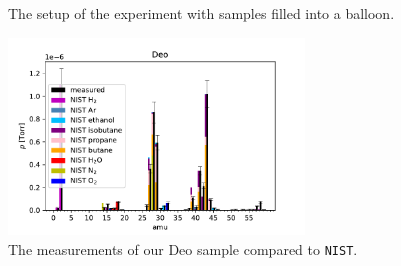     \begin{figure}[h]
            \centering
            \quad
            \quad
            \caption{The setup of the experiment with samples filled into a balloon.}
            \label{fig:setup2}
    \end{figure}

    
    \begin{figure}[h!]
    \centering
    \includegraphics[width=0.7\textwidth]{Report/DataResultsPlots/deo.pdf}
    \caption{The measurements of our Deo sample compared to \texttt{NIST}.}
    \label{fig:deo}
    \end{figure}
    
